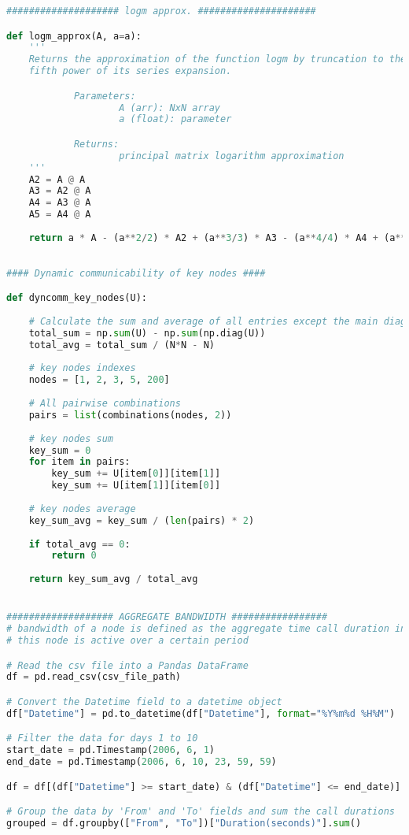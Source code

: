\begin{lstlisting}[language=Python, caption=Second synthetic experiment]
#################### logm approx. #####################

def logm_approx(A, a=a):
    '''
    Returns the approximation of the function logm by truncation to the 
    fifth power of its series expansion.

            Parameters:
                    A (arr): NxN array 
                    a (float): parameter

            Returns:
                    principal matrix logarithm approximation 
    '''
    A2 = A @ A
    A3 = A2 @ A
    A4 = A3 @ A
    A5 = A4 @ A
    
    return a * A - (a**2/2) * A2 + (a**3/3) * A3 - (a**4/4) * A4 + (a**5/5) * A5
    
        
#### Dynamic communicability of key nodes ####

def dyncomm_key_nodes(U):
    
    # Calculate the sum and average of all entries except the main diagonal
    total_sum = np.sum(U) - np.sum(np.diag(U))
    total_avg = total_sum / (N*N - N)
    
    # key nodes indexes
    nodes = [1, 2, 3, 5, 200]
    
    # All pairwise combinations
    pairs = list(combinations(nodes, 2))
    
    # key nodes sum
    key_sum = 0
    for item in pairs:
        key_sum += U[item[0]][item[1]]
        key_sum += U[item[1]][item[0]] 
        
    # key nodes average
    key_sum_avg = key_sum / (len(pairs) * 2)
    
    if total_avg == 0:
        return 0
    
    return key_sum_avg / total_avg


################### AGGREGATE BANDWIDTH #################
# bandwidth of a node is defined as the aggregate time call duration in which 
# this node is active over a certain period 

# Read the csv file into a Pandas DataFrame
df = pd.read_csv(csv_file_path)

# Convert the Datetime field to a datetime object
df["Datetime"] = pd.to_datetime(df["Datetime"], format="%Y%m%d %H%M")

# Filter the data for days 1 to 10
start_date = pd.Timestamp(2006, 6, 1)
end_date = pd.Timestamp(2006, 6, 10, 23, 59, 59)

df = df[(df["Datetime"] >= start_date) & (df["Datetime"] <= end_date)]

# Group the data by 'From' and 'To' fields and sum the call durations
grouped = df.groupby(["From", "To"])["Duration(seconds)"].sum()


\end{lstlisting}
